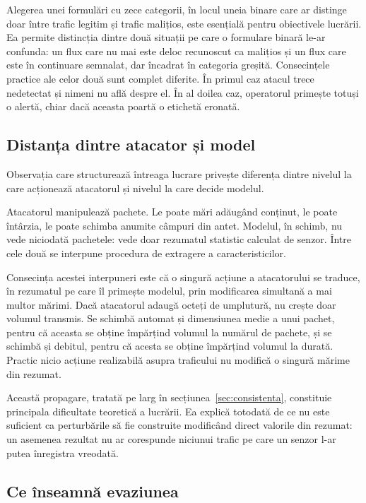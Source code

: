 Alegerea unei formulări cu zece categorii, în locul uneia binare care ar distinge doar între trafic legitim și trafic malițios, este esențială pentru obiectivele lucrării. Ea permite distincția dintre două situații pe care o formulare binară le-ar confunda: un flux care nu mai este deloc recunoscut ca malițios și un flux care este în continuare semnalat, dar încadrat în categoria greșită. Consecințele practice ale celor două sunt complet diferite. În primul caz atacul trece nedetectat și nimeni nu află despre el. În al doilea caz, operatorul primește totuși o alertă, chiar dacă aceasta poartă o etichetă eronată.

\subsection{Distanța dintre atacator și model}\label{subsec:distanta}

Observația care structurează întreaga lucrare privește diferența dintre nivelul la care acționează atacatorul și nivelul la care decide modelul.

Atacatorul manipulează pachete. Le poate mări adăugând conținut, le poate întârzia, le poate schimba anumite câmpuri din antet. Modelul, în schimb, nu vede niciodată pachetele: vede doar rezumatul statistic calculat de senzor. Între cele două se interpune procedura de extragere a caracteristicilor.

Consecința acestei interpuneri este că o singură acțiune a atacatorului se traduce, în rezumatul pe care îl primește modelul, prin modificarea simultană a mai multor mărimi. Dacă atacatorul adaugă octeți de umplutură, nu crește doar volumul transmis. Se schimbă automat și dimensiunea medie a unui pachet, pentru că aceasta se obține împărțind volumul la numărul de pachete, și se schimbă și debitul, pentru că acesta se obține împărțind volumul la durată. Practic nicio acțiune realizabilă asupra traficului nu modifică o singură mărime din rezumat.

Această propagare, tratată pe larg în secțiunea~\ref{sec:consistenta}, constituie principala dificultate teoretică a lucrării. Ea explică totodată de ce nu este suficient ca perturbările să fie construite modificând direct valorile din rezumat: un asemenea rezultat nu ar corespunde niciunui trafic pe care un senzor l-ar putea înregistra vreodată.

\subsection{Ce înseamnă evaziunea}\label{subsec:evaziune}


